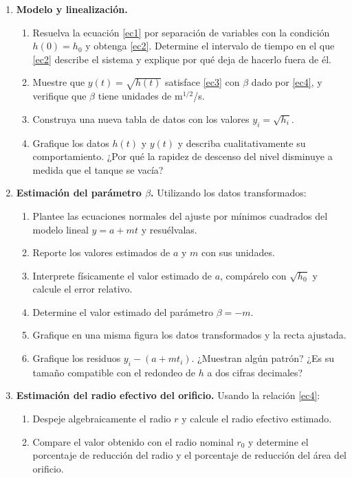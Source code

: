 \documentclass[oneside,letter,spanish,activeacute,english,links,10pt]{amcaGCS_EDO}
\begin{document}
\begin{enumerate}
	\item {\bf Modelo y linealización.}
	\begin{enumerate}
		\item Resuelva la ecuación \eqref{ec1} por separación de variables con la condición $h(0)=h_0$ y obtenga \eqref{ec2}. Determine el intervalo de tiempo en el que \eqref{ec2} describe el sistema y explique por qué deja de hacerlo fuera de él.
		\item Muestre que $y(t)=\sqrt{h(t)}$ satisface \eqref{ec3} con $\beta$ dado por \eqref{ec4}, y verifique que $\beta$ tiene unidades de m$^{1/2}$/s.
		\item Construya una nueva tabla de datos con los valores $y_i=\sqrt{h_i}$.
		\item Grafique los datos $h(t)$ y $y(t)$ y describa cualitativamente su comportamiento. ¿Por qué la rapidez de descenso del nivel disminuye a medida que el tanque se vacía?
	\end{enumerate}
	
	\item {\bf Estimación del parámetro $\beta$.}
	Utilizando los datos transformados:
	\begin{enumerate}
		\item Plantee las ecuaciones normales del ajuste por mínimos cuadrados del modelo lineal $y=a+m t$ y resuélvalas.
		\item Reporte los valores estimados de $a$ y $m$ con sus unidades.
		\item Interprete físicamente el valor estimado de $a$, compárelo con $\sqrt{h_0}$ y calcule el error relativo.
		\item Determine el valor estimado del parámetro $\beta=-m$.
		\item Grafique en una misma figura los datos transformados y la recta ajustada.
		\item Grafique los residuos $y_i-(a+m t_i)$. ¿Muestran algún patrón? ¿Es su tamaño compatible con el redondeo de $h$ a dos cifras decimales?
	\end{enumerate}
	
	\item {\bf Estimación del radio efectivo del orificio.}
	Usando la relación \eqref{ec4}:
	\begin{enumerate}
		\item Despeje algebraicamente el radio $r$ y calcule el radio efectivo estimado.
		\item Compare el valor obtenido con el radio nominal $r_0$ y determine el porcentaje de reducción del radio y el porcentaje de reducción del área del orificio.
	\end{enumerate}
	

\end{enumerate}
\end{document}
